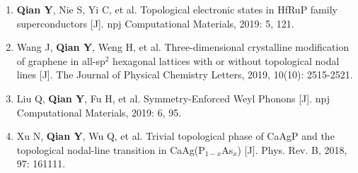 {\begin{enumerate}[nosep]
    \item \textbf{Qian Y}, Nie S, Yi C, et al. Topological electronic states in HfRuP family superconductors [J]. npj Computational Materials, 2019: 5, 121.
    \item Wang J, \textbf{Qian Y}, Weng H, et al. Three-dimensional crystalline modification of graphene in all-sp$^2$ hexagonal lattices with or without topological nodal lines [J]. The Journal of Physical Chemistry Letters, 2019, 10(10): 2515-2521.
    \item Liu Q, \textbf{Qian Y}, Fu H, et al. Symmetry-Enforced Weyl Phonons [J]. npj Computational Materials, 2019: 6, 95.
    \item Xu N, \textbf{Qian Y}, Wu Q, et al. Trivial topological phase of CaAgP and the topological nodal-line transition in CaAg(P$_{1−𝑥}$As$_𝑥$) [J]. Phys. Rev. B, 2018, 97: 161111.
    



\end{enumerate}
}




